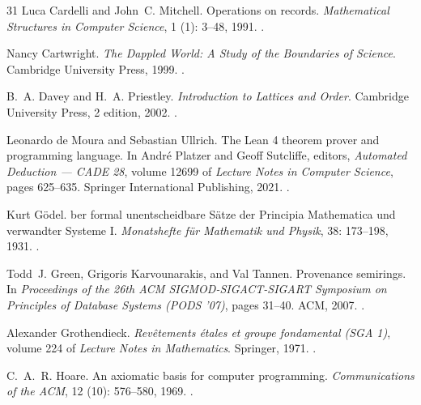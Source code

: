 \documentclass[11pt]{article}
\theoremstyle{definition}
\begin{document}
\begin{thebibliography}{31}
Luca Cardelli and John~C. Mitchell.
\newblock Operations on records.
\newblock \emph{Mathematical Structures in Computer Science}, 1
  (1): 3--48, 1991.
\newblock {}.

Nancy Cartwright.
\newblock \emph{The Dappled World: A Study of the Boundaries of Science}.
\newblock Cambridge University Press, 1999.
\newblock {}.

B.~A. Davey and H.~A. Priestley.
\newblock \emph{Introduction to Lattices and Order}.
\newblock Cambridge University Press, 2 edition, 2002.
\newblock {}.

Leonardo {de Moura} and Sebastian Ullrich.
\newblock The {L}ean 4 theorem prover and programming language.
\newblock In Andr{\'e} Platzer and Geoff Sutcliffe, editors, \emph{Automated
  Deduction --- CADE 28}, volume 12699 of \emph{Lecture Notes in Computer
  Science}, pages 625--635. Springer International Publishing, 2021.
\newblock {}.

Kurt G{\"o}del.
ber formal unentscheidbare {S}{\"a}tze der {P}rincipia
  {M}athematica und verwandter {S}ysteme {I}.
\newblock \emph{Monatshefte f{\"u}r Mathematik und Physik}, 38:
  173--198, 1931.
\newblock {}.

Todd~J. Green, Grigoris Karvounarakis, and Val Tannen.
\newblock Provenance semirings.
\newblock In \emph{Proceedings of the 26th ACM SIGMOD-SIGACT-SIGART Symposium
  on Principles of Database Systems (PODS '07)}, pages 31--40. ACM, 2007.
\newblock {}.

Alexander Grothendieck.
\newblock \emph{Rev{\^e}tements {\'e}tales et groupe fondamental ({SGA} 1)},
  volume 224 of \emph{Lecture Notes in Mathematics}.
\newblock Springer, 1971.
\newblock {}.

C.~A.~R. Hoare.
\newblock An axiomatic basis for computer programming.
\newblock \emph{Communications of the ACM}, 12 (10):
  576--580, 1969.
\newblock {}.


\end{thebibliography}
\end{document}

